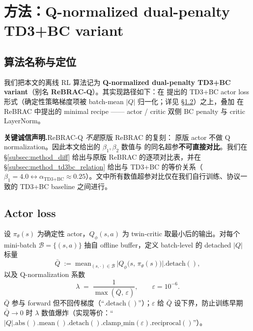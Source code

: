 
\section{方法：Q-normalized dual-penalty TD3+BC variant}
\label{sec:method}

\subsection{算法名称与定位}
\label{subsec:method_naming}

我们把本文的离线 RL 算法记为 \textbf{Q-normalized dual-penalty TD3+BC variant}（别名 \textbf{ReBRAC-Q}）。其实现路径如下：在 \citet{fujimoto2021td3bc} 提出的 TD3+BC actor loss 形式（确定性策略梯度项被 batch-mean $|Q|$ 归一化；详见 \S\ref{subsec:method_actor_loss}）之上，叠加 \citet{tarasov2023rebrac} 在 ReBRAC 中提出的 minimal recipe —— actor / critic 双侧 BC penalty 与 critic LayerNorm。

\textbf{关键诚信声明.}\quad ReBRAC-Q \emph{不是}原版 ReBRAC 的复刻：\citet{tarasov2023rebrac} 原版 actor 不做 Q normalization。因此本文给出的 $\beta_1, \beta_2$ 数值与 \citet{tarasov2023rebrac} 的同名超参\textbf{不可直接对比}。我们在 \S\ref{subsec:method_diff} 给出与原版 ReBRAC 的逐项对比表，并在 \S\ref{subsec:method_td3bc_relation} 给出与 TD3+BC 的等价关系（$\beta_1 = 4.0 \leftrightarrow \alpha_{\text{TD3+BC}} \approx 0.25$）。文中所有数值超参对比仅在我们自行训练、协议一致的 TD3+BC baseline 之间进行。

\subsection{Actor loss}
\label{subsec:method_actor_loss}

设 $\pi_\theta(s)$ 为确定性 actor，$Q_\phi(s, a)$ 为 twin-critic 取最小后的输出。对每个 mini-batch $\mathcal{B} = \{(s, a)\}$ 抽自 offline buffer，定义 batch-level 的 detached $|Q|$ 标量
\begin{equation}
\bar{Q} \;:=\; \mathrm{mean}_{(s, \cdot) \in \mathcal{B}}\,\bigl|Q_\phi\bigl(s,\, \pi_\theta(s)\bigr)\bigr|.\mathrm{detach}(),
\label{eq:qbar_def}
\end{equation}
以及 Q-normalization 系数
\begin{equation}
\lambda \;=\; \frac{1}{\max(\bar{Q},\,\varepsilon)},\qquad \varepsilon = 10^{-6}.
\label{eq:lambda_def}
\end{equation}
$\bar{Q}$ 参与 forward 但不回传梯度（``$.\mathrm{detach}()$''）；$\varepsilon$ 给 $\bar{Q}$ 设下界，防止训练早期 $\bar{Q} \to 0$ 时 $\lambda$ 数值爆炸（实现等价：``$|Q|.\mathrm{abs}().\mathrm{mean}().\mathrm{detach}().\mathrm{clamp\_min}(\varepsilon).\mathrm{reciprocal}()$''）。

